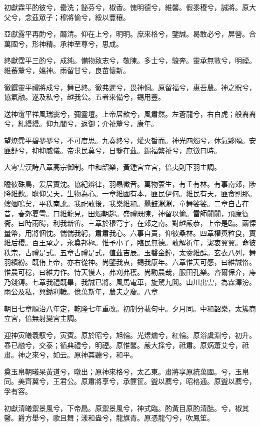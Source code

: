 \begin{pinyinscope}
初獻霖平酌彼兮，罍洗；飶芬兮，椒香。愧明德兮，維馨。假黍稷兮，誠將。原大父兮，念茲眾子；穆將愉兮，綏以豐穰。

亞獻露平再酌兮，醑清。仰在上兮，明明。庶來格兮，鑒誠。曷敢必兮，屏營。合萬國兮，形神精。承神至尊兮，思成。

終獻霑平三酌兮，成純。備物致志兮，敬陳。多士兮，駿奔。靈承無斁兮，明禋。維蕃釐兮，媼神。雨留甘兮，良苗懷新。

徹饌靈平禮將成兮，舞已終。徹弗遲兮，畏神恫。原留福兮，惠吾農。神之貺兮，協氣融。遂及私兮，越我公。五者來備兮，錫用豐。

送神霮平祥風瑞靄兮，彌靈壇。上帝居歆兮，風肅然。左蒼龍兮，右白虎；般裔裔兮，糺縵縵。仰九閶兮，返御；介祉釐兮，康年。

望燎霈平碧翏翏兮，不可度思。九奏終兮，爟火晳而。神光四燭兮，休氣夥頤。安匪舒兮，抑抑威儀。帝求民莫兮，日鑒在茲。錫福繁祉兮，庶徵曰時。

大雩雲漢詩八章高宗御制。中和韶樂，黃鍾宮立宮，倍夷則下羽主調。

瞻彼硃鳥，爰居實沈。協紀辨律，羽蟲徵音。萬物蕓生，有壬有林。有事南郊，陟降維欽。瞻仰昊天，生物為心。一章維國有本，匪民伊何。維民有天，匪食則那。螻蟈鳴矣，平秩南訛。我祀敢後，我樂維和。鼉鼓淵淵，童舞娑娑。二章自古在昔，春郊夏雩。曰維龍見，田燭朝趨。盛禮既陳，神留以愉。雷師闐闐，飛廉衙衙。曰時雨暘，利我新畬。三章於穆穹宇，在郊之南。對越嚴恭，上帝是臨。繭慄量幣，用將悃忱。惴惴我躬，肅肅我心。六事自責，仰彼桑林。四章權輿粒食，實維后稷。百王承之，永奠邦極。惟予小子，臨民無德。敢解祈年，潔衷翼翼。命彼秩宗，古禮是式。五章古禮是式，值茲吉辰。玉磬金鐘，太羹維醇。玄衣八列，舞羽繽紛。既侑上帝，亦右從神。尚鑒我衷，錫我康年。六章惟天可感，曰維誠恪。惟農可稔，曰維力作。恃天慢人，弗刈弗穫。尚勸農哉，服田孔樂。咨爾保介，庤乃錢鎛。七章我禮既畢，我誠已將。風馬電車，旋駕九閶。山川出雲，為霖澤滂。雨公及私，興鋤利轆。億萬斯年，農夫之慶。八章

朝日七章順治八年定，乾隆七年重改。初制分載句中。夕月同。中和韶樂，太簇商立宮，倍無射變宮主調。

迎神寅曦羲馭兮，寅賓。原於昭兮，旭輪。光煜爚兮，紅輪。原浴虞淵兮，初升。春已融兮，交泰；循典禮兮，明禋。原惟馨。嚴大採兮，祗肅。原焫蕭艾兮，祗肅。神之來兮，如云。原神其聽兮，和平。

奠玉帛朝曦杲黃道兮，暾出；原神來格兮，太乙東。肅將享原統萬國。兮，玉帛同。美齊翼兮，王君公。原肅將享兮，承篚筐。盥以薦兮，昭格通。原盥以薦兮，孚有容。

初獻清曦禦景風兮，下帝扃。原禦景風兮，神式臨。酌黃目原酌清酤。兮，椒其馨。爵方舉兮，歌且舞；漾和盎兮，龍旗青。原憑龍勺兮，吹鳳笙。


\end{pinyinscope}
